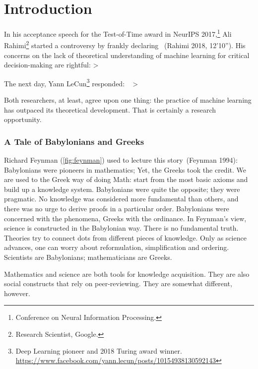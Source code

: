 \documentclass[
  letterpaper,
]{tufte-book}
\begin{document}

\hypertarget{ch:introduction}{%
\chapter{Introduction}\label{ch:introduction}}

In his acceptance speech for the Test-of-Time award in NeurIPS
2017,\footnote{Conference on Neural Information Processing.} Ali
Rahimi\footnote{Research Scientist, Google.} started a controversy by
frankly declaring ~(Rahimi 2018, 12'10''). His concerns on the lack of
theoretical understanding of machine learning for critical
decision-making are rightful: \textgreater{} \textbar{}

The next day, Yann LeCun\footnote{Deep Learning pioneer and 2018 Turing
  award winner.
  \url{https://www.facebook.com/yann.lecun/posts/10154938130592143}}
responded: ~ \textgreater{} \textbar{}

Both researchers, at least, agree upon one thing: the practice of
machine learning has outpaced its theoretical development. That is
certainly a research opportunity.

\hypertarget{sec:greeks}{%
\subsection{A Tale of Babylonians and Greeks}\label{sec:greeks}}

Richard Feynman (\protect\hyperlink{fig:feynman}{{[}fig:feynman{]}})
used to lecture this story~(Feynman 1994): Babylonians were pioneers in
mathematics; Yet, the Greeks took the credit. We are used to the Greek
way of doing Math: start from the most basic axioms and build up a
knowledge system. Babylonians were quite the opposite; they were
pragmatic. No knowledge was considered more fundamental than others, and
there was no urge to derive proofs in a particular order. Babylonians
were concerned with the phenomena, Greeks with the ordinance. In
Feynman's view, science is constructed in the Babylonian way. There is
no fundamental truth. Theories try to connect dots from different pieces
of knowledge. Only as science advances, one can worry about
reformulation, simplification and ordering. Scientists are Babylonians;
mathematicians are Greeks.

Mathematics and science are both tools for knowledge acquisition. They
are also social constructs that rely on peer-reviewing. They are
somewhat different, however.
\end{document}
